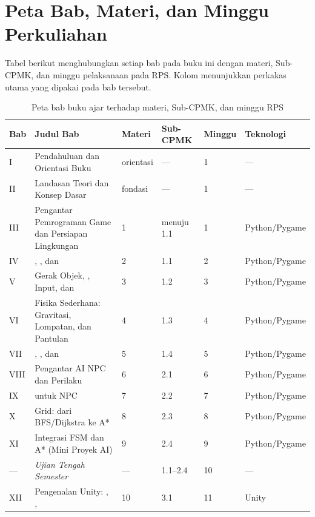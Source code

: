 \clearpage

\section*{Peta Bab, Materi, dan Minggu Perkuliahan}

Tabel berikut menghubungkan setiap bab pada buku ini dengan materi, Sub-CPMK,
dan minggu pelaksanaan pada RPS. Kolom  menunjukkan
perkakas utama yang dipakai pada bab tersebut.

\begin{table}[htbp]
\centering
{\setlength{\tabcolsep}{4pt}\footnotesize%
\caption{Peta bab buku ajar terhadap materi, Sub-CPMK, dan minggu RPS}
\label{tab:peta-bab}
\begin{tabularx}{\textwidth}{@{}C{1.2cm} L{4.3cm} C{1.5cm} C{1.8cm} C{1.5cm} Y@{}}
\toprule
\headrow \textbf{Bab} & \textbf{Judul Bab} & \textbf{Materi} & \textbf{Sub-CPMK} & \textbf{Minggu} & \textbf{Teknologi} \\
\midrule
I   & Pendahuluan dan Orientasi Buku & orientasi & --- & 1 & --- \\
II  & Landasan Teori dan Konsep Dasar & fondasi & --- & 1 & --- \\
III & Pengantar Pemrograman Game dan Persiapan Lingkungan & 1 & menuju 1.1 & 1 & Python/Pygame \\
IV  & , , dan  & 2 & 1.1 & 2 & Python/Pygame \\
V   & Gerak Objek, , Input, dan  & 3 & 1.2 & 3 & Python/Pygame \\
VI  & Fisika Sederhana: Gravitasi, Lompatan, dan Pantulan & 4 & 1.3 & 4 & Python/Pygame \\
VII & , , dan  & 5 & 1.4 & 5 & Python/Pygame \\
VIII& Pengantar AI NPC dan Perilaku  & 6 & 2.1 & 6 & Python/Pygame \\
IX  &  untuk NPC & 7 & 2.2 & 7 & Python/Pygame \\
X   &  Grid: dari BFS/Dijkstra ke A* & 8 & 2.3 & 8 & Python/Pygame \\
XI  & Integrasi FSM dan A* (Mini Proyek AI) & 9 & 2.4 & 9 & Python/Pygame \\
---  & \itshape Ujian Tengah Semester & --- & 1.1--2.4 & 10 & --- \\
XII & Pengenalan Unity: , ,  & 10 & 3.1 & 11 & Unity \\

\end{tabularx}}
\end{table}
